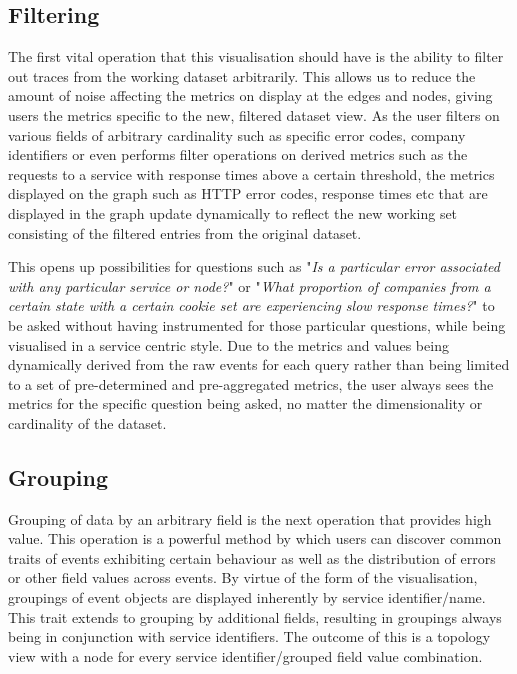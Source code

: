 \documentclass[12pt,pdftex,titlepage]{report}
\begin{document}
            \subsection{Filtering}
                The first vital operation that this visualisation should have is the ability to filter out traces from the working dataset arbitrarily. This allows us to reduce the amount of noise affecting the metrics
                on display at the edges and nodes, giving users the metrics specific to the new, filtered dataset view. As the user filters on various fields of arbitrary cardinality such as specific error codes,
                company identifiers or even performs filter operations on derived metrics such as the requests to a service with response times above a certain threshold, the metrics displayed on the graph such as HTTP error codes, 
                response times etc that are displayed in the graph update dynamically to reflect the new working set consisting of the filtered entries from the original dataset. 
                
                This opens up possibilities for questions such as "\textit{Is a particular error associated with any particular service or node?}" or "\textit{What proportion of companies from a certain state with a certain 
                cookie set are experiencing slow response times?}" to be asked without having instrumented for those particular questions, while being visualised in a service centric style. Due to the metrics and values being dynamically 
                derived from the raw events for each query rather than being limited to a set of pre-determined and pre-aggregated metrics, the user always sees the metrics for the specific question being asked, no matter the dimensionality
                or cardinality of the dataset.

            \subsection{Grouping}
                Grouping of data by an arbitrary field is the next operation that provides high value. This operation is a powerful method by which users can discover common traits of events exhibiting certain behaviour as well as the
                distribution of errors or other field values across events. By virtue of the form of the visualisation, groupings of event objects are displayed inherently by service identifier/name. This trait extends to grouping by
                additional fields, resulting in groupings always being in conjunction with service identifiers. The outcome of this is a topology view with a node for every service identifier/grouped field value combination. 
                
\end{document}
